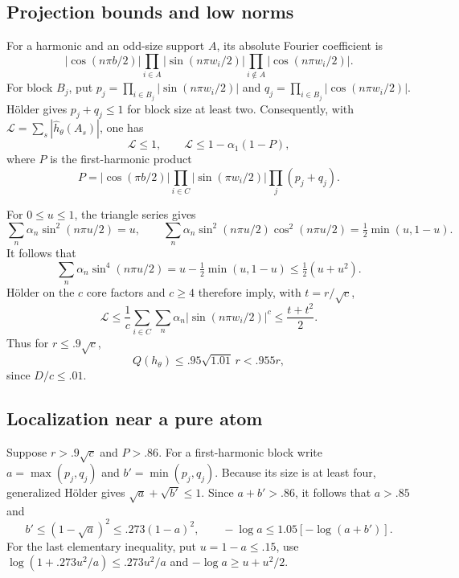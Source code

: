 \documentclass[11pt]{article}
\begin{document}
\subsection{Projection bounds and low norms}

For a harmonic and an odd-size support $A$, its absolute Fourier
coefficient is
\[
 |\cos(n\pi b/2)|
 \prod_{i\in A}|\sin(n\pi w_i/2)|
 \prod_{i\notin A}|\cos(n\pi w_i/2)|.
\]
For block $B_j$, put
$p_j=\prod_{i\in B_j}|\sin(n\pi w_i/2)|$ and
$q_j=\prod_{i\in B_j}|\cos(n\pi w_i/2)|$.
H\"older gives $p_j+q_j\le1$ for block size at least two.
Consequently, with
$\mathcal L=\sum_s|\widehat h_\theta(A_s)|$, one has
\begin{equation}\label{eq:Lfirstharmonic}
 \mathcal L\le1,\qquad
 \mathcal L\le1-\alpha_1(1-P),
\end{equation}
where $P$ is the first-harmonic product
\[
 P=|\cos(\pi b/2)|\prod_{i\in C}|\sin(\pi w_i/2)|
                         \prod_j(p_j+q_j).
\]

For $0\le u\le1$, the triangle series gives
\[
 \sum_n\alpha_n\sin^2(n\pi u/2)=u,\qquad
 \sum_n\alpha_n\sin^2(n\pi u/2)\cos^2(n\pi u/2)
                  =\tfrac12\min(u,1-u).
\]
It follows that
\[
 \sum_n\alpha_n\sin^4(n\pi u/2)
    =u-\tfrac12\min(u,1-u)\le\tfrac12(u+u^2).
\]
H\"older on the $c$ core factors and $c\ge4$ therefore imply,
with $t=r/\sqrt c$,
\[
 \mathcal L\le\frac1c\sum_{i\in C}\sum_n\alpha_n
              |\sin(n\pi w_i/2)|^c\le\frac{t+t^2}{2}.
\]
Thus for $r\le.9\sqrt c$,
\begin{equation}\label{eq:lownormgap}
 Q(h_\theta)\le.95\sqrt{1.01}\,r<.955r,
\end{equation}
since $D/c\le.01$.

\subsection{Localization near a pure atom}

Suppose $r>.9\sqrt c$ and $P>.86$. For a first-harmonic block write
$a=\max(p_j,q_j)$ and $b'=\min(p_j,q_j)$. Because its size is at
least four, generalized H\"older gives
$\sqrt a+\sqrt{b'}\le1$. Since $a+b'>.86$, it follows that
$a>.85$ and
\[
 b'\le(1-\sqrt a)^2\le.273(1-a)^2,
 \qquad -\log a\le1.05[-\log(a+b')].
\]
For the last elementary inequality, put $u=1-a\le.15$, use
$\log(1+.273u^2/a)\le.273u^2/a$ and
$-\log a\ge u+u^2/2$.
\end{document}
